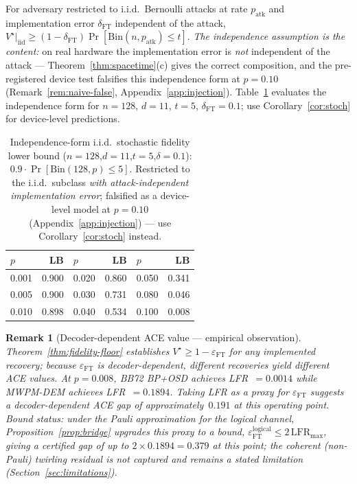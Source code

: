 \documentclass[11pt,a4paper]{article}
\newtheorem{remark}{Remark}
\begin{document}
\begin{proposition}\label{prop:stochastic}
For adversary restricted to i.i.d.\ Bernoulli attacks at rate $p_\mathrm{atk}$
and implementation error $\delta_\mathrm{FT}$ independent of the attack,
$V^\star|_\mathrm{iid}\ge(1-\delta_\mathrm{FT})\Pr[\mathrm{Bin}(n,p_\mathrm{atk})\le t]$.
\emph{The independence assumption is the content:} on real hardware the
implementation error is \emph{not} independent of the attack ---
Theorem~\ref{thm:spacetime}(c) gives the correct composition, and the
pre-registered device test falsifies this independence form at
$p=0.10$ (Remark~\ref{rem:naive-false}, Appendix~\ref{app:injection}).
Table~\ref{tab:minimax} evaluates the independence form for $n=128$,
$d=11$, $t=5$, $\delta_\mathrm{FT}=0.1$; use
Corollary~\ref{cor:stoch} for device-level predictions.
\end{proposition}

\begin{table}[H]\centering\small
\caption{Independence-form i.i.d.\ stochastic fidelity lower bound
  ($n=128$,$d=11$,$t=5$,$\delta=0.1$): $0.9\cdot\Pr[\mathrm{Bin}(128,p)\le5]$.
  Restricted to the i.i.d.\ subclass \emph{with attack-independent
  implementation error}; falsified as a device-level model at $p=0.10$
  (Appendix~\ref{app:injection}) --- use Corollary~\ref{cor:stoch}
  instead.}\label{tab:minimax}
\begin{tabular}{@{}lrlrlr@{}}
\toprule
$p$ & LB & $p$ & LB & $p$ & LB \\\midrule
0.001 & 0.900 & 0.020 & 0.860 & 0.050 & 0.341 \\
0.005 & 0.900 & 0.030 & 0.731 & 0.080 & 0.046 \\
0.010 & 0.898 & 0.040 & 0.534 & 0.100 & 0.008 \\\bottomrule
\end{tabular}
\end{table}

\begin{remark}[Decoder-dependent ACE value --- empirical observation]
\label{rem:decoder-gap}
Theorem~\ref{thm:fidelity-floor} establishes $V^\star\ge1-\varepsilon_{\mathrm{FT}}$
for any implemented recovery; because $\varepsilon_{\mathrm{FT}}$ is
decoder-dependent, different recoveries yield different ACE values.
At $p=0.008$, BB72 BP+OSD achieves LFR~$=0.0014$ while MWPM-DEM achieves
LFR~$=0.1894$.
Taking LFR as a proxy for $\varepsilon_{\mathrm{FT}}$ suggests a
decoder-dependent ACE gap of approximately~$0.191$ at this operating point.
\emph{Bound status:} under the Pauli approximation for the logical
channel, Proposition~\ref{prop:bridge} upgrades this proxy to a bound,
$\varepsilon_{\mathrm{FT}}^{\mathrm{logical}}\le2\,\mathrm{LFR}_{\max}$,
giving a certified gap of up to $2\times0.1894=0.379$ at this point;
the coherent (non-Pauli) twirling residual is not captured and remains
a stated limitation (Section~\ref{sec:limitations}).
\end{remark}
\end{document}
